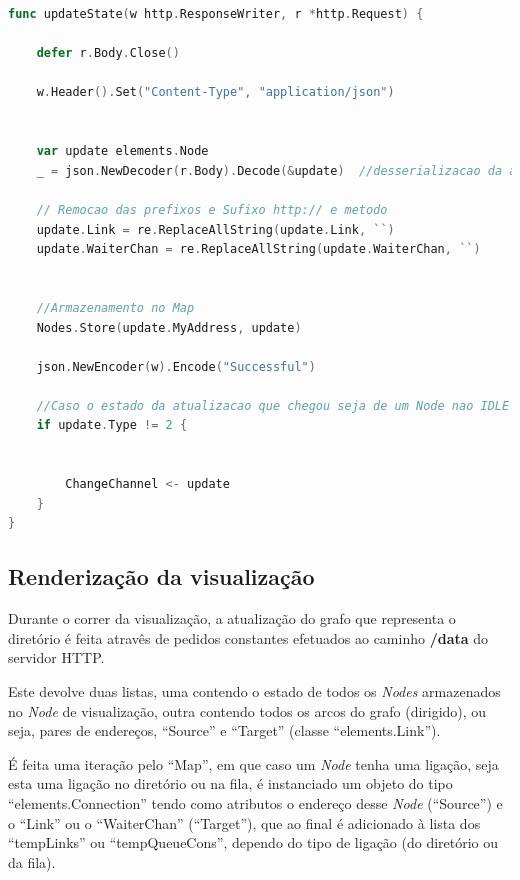 \begin{lstlisting}[caption={\emph{Handler} ``updateState'' do método ``/updateState''},language=Go]
	func updateState(w http.ResponseWriter, r *http.Request) {

	defer r.Body.Close()

	w.Header().Set("Content-Type", "application/json")


	var update elements.Node
	_ = json.NewDecoder(r.Body).Decode(&update)  //desserializacao da atualizacao numa struct do tipo Node

	// Remocao das prefixos e Sufixo http:// e metodo
	update.Link = re.ReplaceAllString(update.Link, ``)
	update.WaiterChan = re.ReplaceAllString(update.WaiterChan, ``)

	
	//Armazenamento no Map
	Nodes.Store(update.MyAddress, update)

	json.NewEncoder(w).Encode("Successful")

	//Caso o estado da atualizacao que chegou seja de um Node nao IDLE (2)
	if update.Type != 2 {

		
		ChangeChannel <- update
	}
}

\end{lstlisting}


\subsection*{Renderização da visualização}

Durante o correr da visualização, a atualização do grafo que representa o diretório é feita atravês de 
pedidos constantes efetuados ao caminho \textbf{/data} do servidor \acs{HTTP}.

Este devolve duas listas, uma contendo o estado de todos os \emph{Nodes} armazenados no \emph{Node} de visualização, 
outra contendo todos os arcos do grafo (dirigido), ou seja, pares de endereços, ``Source'' e ``Target'' (classe ``elements.Link''). 

É feita uma iteração pelo ``Map'', em que caso um \emph{Node} tenha uma ligação, seja esta uma ligação no diretório ou na fila, é instanciado 
um objeto do tipo 
``elements.Connection'' tendo como atributos o endereço desse \emph{Node} (``Source'') e o ``Link'' ou o ``WaiterChan'' (``Target''), que ao final é 
adicionado à lista dos ``tempLinks'' ou ``tempQueueCons'', dependo do tipo de ligação (do diretório ou da fila).


